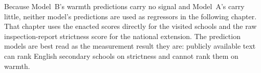 Because Model~B's warmth predictions carry no signal and Model~A's carry
little, neither model's predictions are used as regressors in the following
chapter. That chapter uses the enacted scores directly for the visited
schools and the raw inspection-report strictness score for the national
extension. The prediction models are best read as the measurement result they
are: publicly available text can rank English secondary schools on strictness
and cannot rank them on warmth.
